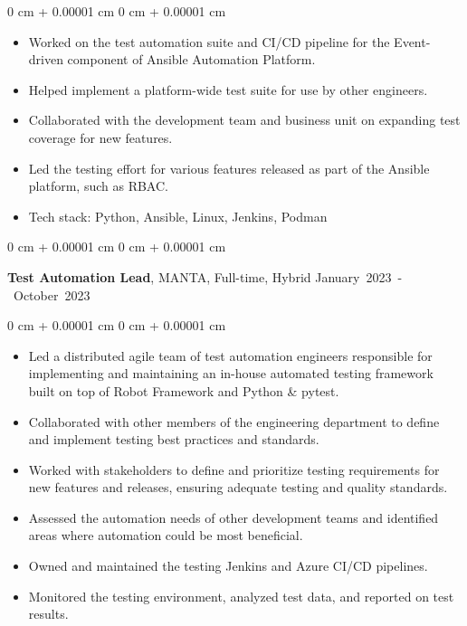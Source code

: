 \documentclass[10pt, a4paper]{article}
\newenvironment{highlights}{
    \begin{itemize}[
        topsep=0.05 cm,
        parsep=0.05 cm,
        partopsep=0pt,
        itemsep=0pt,
        leftmargin=0 cm + 10pt
    ]
}{
    \end{itemize}
} %
\newenvironment{onecolentry}{
    \begin{adjustwidth}{
        0 cm + 0.00001 cm
    }{
        0 cm + 0.00001 cm
    }
}{
    \end{adjustwidth}
} %
\newenvironment{twocolentry}[2][]{
    \onecolentry
    \def\secondColumn{#2}
    \setcolumnwidth{\fill, 4.5 cm}
    \begin{paracol}{2}
}{
    \switchcolumn \raggedleft \secondColumn
    \end{paracol}
    \endonecolentry
} %
\begin{document}
        \begin{onecolentry}
            \begin{highlights}
                \item Worked on the test automation suite and CI/CD pipeline for the Event-driven component of Ansible Automation Platform.
                \item Helped implement a platform-wide test suite for use by other engineers.
                \item Collaborated with the development team and business unit on expanding test coverage for new features.
                \item Led the testing effort for various features released as part of the Ansible platform, such as RBAC.
                \item Tech stack: Python, Ansible, Linux, Jenkins, Podman
            \end{highlights}
        \end{onecolentry}

        \vspace{0.5 cm}

        \begin{twocolentry}{
            \small\mbox{January 2023 - October 2023}
        }
            \textbf{Test Automation Lead}, MANTA, Full-time, Hybrid\end{twocolentry}

        \vspace{0.10 cm}
        \begin{onecolentry}
            \begin{highlights}
                \item Led a distributed agile team of test automation engineers responsible for implementing and maintaining an in-house automated testing framework built on top of Robot Framework and Python & pytest.
                \item Collaborated with other members of the engineering department to define and implement testing best practices and standards.
                \item Worked with stakeholders to define and prioritize testing requirements for new features and releases, ensuring adequate testing and quality standards.
                \item Assessed the automation needs of other development teams and identified areas where automation could be most beneficial.
                \item Owned and maintained the testing Jenkins and Azure CI/CD pipelines.
                \item Monitored the testing environment, analyzed test data, and reported on test results.
            \end{highlights}
        \end{onecolentry}
\end{document}
